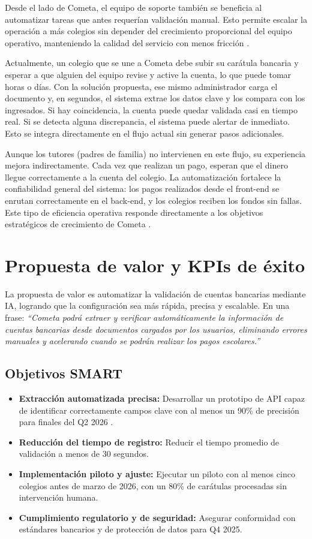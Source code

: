 Desde el lado de Cometa, el equipo de soporte también se beneficia al automatizar tareas que antes requerían validación manual. Esto permite escalar la operación a más colegios sin depender del crecimiento proporcional del equipo operativo, manteniendo la calidad del servicio con menos fricción \cite{cometa_inversion}.  

Actualmente, un colegio que se une a Cometa debe subir su carátula bancaria y esperar a que alguien del equipo revise y active la cuenta, lo que puede tomar horas o días. Con la solución propuesta, ese mismo administrador carga el documento y, en segundos, el sistema extrae los datos clave y los compara con los ingresados. Si hay coincidencia, la cuenta puede quedar validada casi en tiempo real. Si se detecta alguna discrepancia, el sistema puede alertar de inmediato. Esto se integra directamente en el flujo actual sin generar pasos adicionales.

Aunque los tutores (padres de familia) no intervienen en este flujo, su experiencia mejora indirectamente. Cada vez que realizan un pago, esperan que el dinero llegue correctamente a la cuenta del colegio. La automatización fortalece la confiabilidad general del sistema: los pagos realizados desde el front-end se enrutan correctamente en el back-end, y los colegios reciben los fondos sin fallas. Este tipo de eficiencia operativa responde directamente a los objetivos estratégicos de crecimiento de Cometa \cite{cometa_inversion}.

\section{Propuesta de valor y KPIs de éxito}

La propuesta de valor es automatizar la validación de cuentas bancarias mediante IA, logrando que la configuración sea más rápida, precisa y escalable. En una frase:  
\textit{“Cometa podrá extraer y verificar automáticamente la información de cuentas bancarias desde documentos cargados por los usuarios, eliminando errores manuales y acelerando cuando se podrán realizar los pagos escolares.”}

\subsection*{Objetivos SMART}
\begin{itemize}
  \item \textbf{Extracción automatizada precisa:} Desarrollar un prototipo de API capaz de identificar correctamente campos clave con al menos un 90\% de precisión para finales del Q2 2026 \cite{layoutlm}.
  \item \textbf{Reducción del tiempo de registro:} Reducir el tiempo promedio de validación a menos de 30 segundos.
  \item \textbf{Implementación piloto y ajuste:} Ejecutar un piloto con al menos cinco colegios antes de marzo de 2026, con un 80\% de carátulas procesadas sin intervención humana.
  \item \textbf{Cumplimiento regulatorio y de seguridad:} Asegurar conformidad con estándares bancarios y de protección de datos para Q4 2025.
\end{itemize}

